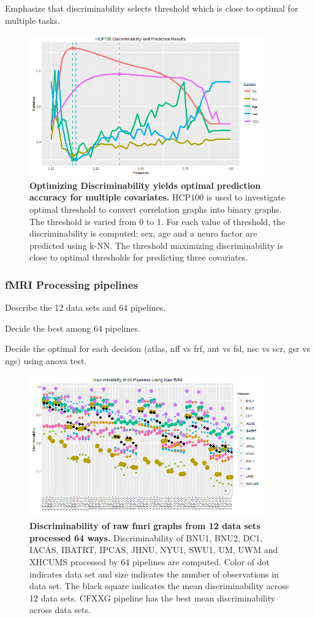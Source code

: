 \documentclass{article}
\begin{document}
 Emphasize that discriminability selects threshold which is close to optimal for multiple tasks.

\begin{figure}[ht!]
\includegraphics[width=4.0in]{../Figs/HCP_100.png}
\caption{{\bf Optimizing Discriminability yields optimal prediction accuracy for multiple covariates.} HCP100 is used to investigate optimal threshold to convert correlation graphs into binary graphs. The threshold is varied from 0 to 1. For each value of threshold, the discriminability is computed;  sex, age and a neuro factor are predicted using k-NN. The threshold maximizing discriminability is close to optimal thresholds for predicting three covariates. }
\label{fig:4}
\end{figure}

\subsubsection{fMRI Processing pipelines}
 Describe the 12 data sets and 64 pipelines. 

 Decide the best among 64 pipelines.

 Decide the optimal for each decision (atlas, nff vs frf, ant vs fsl, nsc vs scr, gsr vs ngs) using anova test.
\begin{figure}[ht!]
	\includegraphics[width=4.0in]{../Figs/64_pipelines_raw.png}
	\caption{{\bf Discriminability of raw fmri graphs from 12 data sets processed 64 ways.}  Discriminability of BNU1, BNU2, DC1, IACAS, IBATRT, IPCAS, JHNU, NYU1, SWU1, UM, UWM and XHCUMS processed by 64 pipelines are computed. Color of dot indicates data set and size indicates the number of observations in data set. The black square indicates the mean discriminability across 12 data sets. CFXXG pipeline has the best mean discriminability across data sets. }
	\label{fig:6}
\end{figure}
\end{document}
